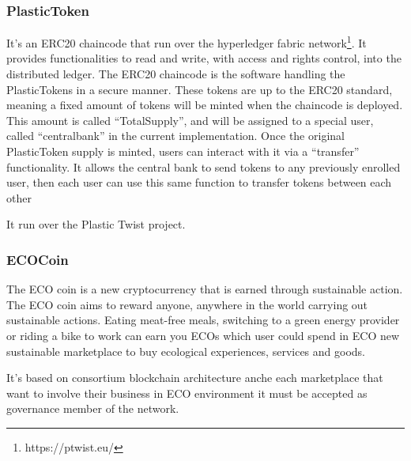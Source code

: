 \subsubsection{PlasticToken}

It's an ERC20 chaincode that run over the hyperledger fabric network\footnote{https://ptwist.eu/}. It provides functionalities to read
and write, with access and rights control, into the distributed ledger. The ERC20 chaincode is the software 
handling the PlasticTokens in a secure manner. These tokens are up to the ERC20 standard, meaning a fixed 
amount of tokens will be minted when the chaincode is deployed. This amount is called “TotalSupply”, and 
will be assigned to a special user, called “centralbank” in the current implementation.
Once the original PlasticToken supply is minted, users can interact with it via a “transfer” functionality. It
allows the central bank to send tokens to any previously enrolled user, then each user can use this same
function to transfer tokens between each other

It run over the Plastic Twist project. 

\subsubsection{ECOCoin}

The ECO coin is a new cryptocurrency that is earned through sustainable action. The ECO coin
aims to reward anyone, anywhere in the world carrying out sustainable actions. Eating meat-free
meals, switching to a green energy provider or riding a bike to work can earn you ECOs which
user could spend in ECO new sustainable marketplace to buy ecological experiences, services and
goods. 

It's based on consortium blockchain architecture anche each marketplace that want to involve their
business in ECO environment it must be accepted as governance member of the network. 